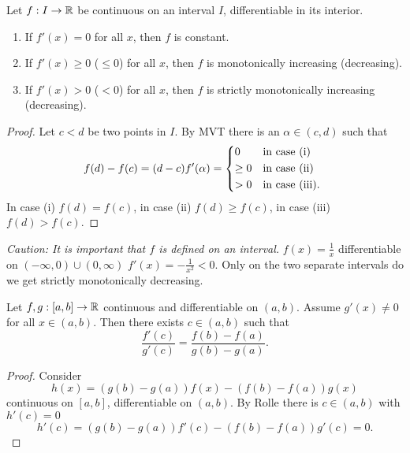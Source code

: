 \documentclass[10pt, a4paper]{article}
\begin{document}
\begin{theorem}
    Let $f : I \rightarrow \mathbb{R}$ be continuous on an interval $I$,
    differentiable in its interior.
    \begin{enumerate}[label = (\roman*)]
        \item If $f'(x) = 0$ for all $x$,
        then $f$ is constant.

        \item If $f'(x) \geq 0$
        ($\leq 0$)
        for all $x$,
        then $f$ is monotonically increasing
        (decreasing).

        \item If $f'(x) > 0$
        ($< 0$)
        for all $x$,
        then $f$ is strictly monotonically increasing
        (decreasing).
    \end{enumerate}
    \begin{proof}
        Let $c < d$ be two points in $I$.
        By MVT there is an $\alpha \in (c, d)$ such that
        \[
        f(d) - f(c) = (d - c)f'(\alpha) = \begin{dcases*}
            0 & in case (i) \\
            \geq 0 & in case (ii) \\
            > 0 & in case (iii).
        \end{dcases*}
        \]
        In case (i) $f(d) = f(c)$,
        in case (ii) $f(d) \geq f(c)$,
        in case (iii) $f(d) > f(c)$.
    \end{proof}
\end{theorem}

\textit{Caution:
It is important that $f$ is defined on an interval.}
$f(x) = \frac{1}{x}$ differentiable on $(-\infty, 0) \cup (0, \infty)$ $f'(x) = -\frac{1}{x ^ 2} < 0$.
Only on the two separate intervals do we get strictly monotonically decreasing.

\begin{theorem}
    Let $f, g : [a, b] \rightarrow \mathbb{R}$ continuous and differentiable on $(a, b)$.
    Assume $g'(x) \neq 0$ for all $x \in (a, b)$.
    Then there exists $c \in (a, b)$ such that
    \[
    \frac{f'(c)}{g'(c)} = \frac{f(b) - f(a)}{g(b) - g(a)}.
    \]

    \begin{proof}
        Consider
        \[
        h(x) = (g(b) - g(a))f(x) - (f(b) - f(a))g(x)
        \]
        continuous on $[a, b]$,
        differentiable on $(a, b)$.
        By Rolle there is $c \in (a, b)$ with $h'(c) = 0$
        \[
        h'(c) = (g(b) - g(a))f'(c) - (f(b) - f(a))g'(c) = 0.
        \]
    \end{proof}
\end{theorem}
\end{document}

